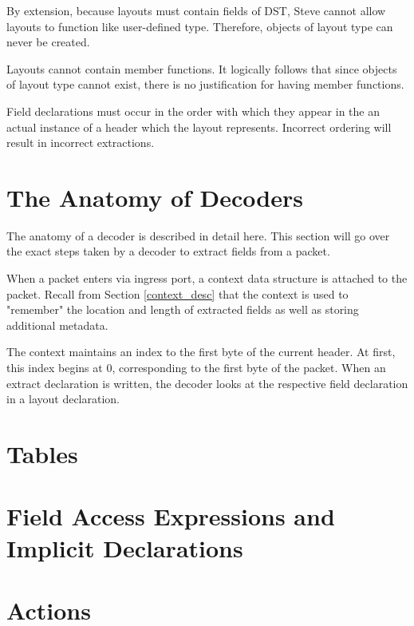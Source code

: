 By extension, because layouts must contain fields of DST, Steve cannot allow layouts to function like user-defined type. Therefore, objects of layout type can never be created.
  
Layouts cannot contain member functions. It logically follows that since objects of layout type cannot exist, there is no justification for having member functions.

Field declarations must occur in the order with which they appear in the an actual instance of a header which the layout represents. Incorrect ordering will result in incorrect extractions.

\section{The Anatomy of Decoders} \label{decoder_guide}

The anatomy of a decoder is described in detail here. This section will go over the exact steps taken by a decoder to extract fields from a packet.

When a packet enters via ingress port, a context data structure is attached to the packet. Recall from Section \ref{context_desc} that the context is used to "remember" the location and length of extracted fields as well as storing additional metadata. 

The context maintains an index to the first byte of the current header. At first, this index begins at 0, corresponding to the first byte of the packet. When an extract declaration is written, the decoder looks at the respective field declaration in a layout declaration. 


\section{Tables} \label{table_guide}

\section{Field Access Expressions and Implicit Declarations}

\section{Actions} \label{action_guide}